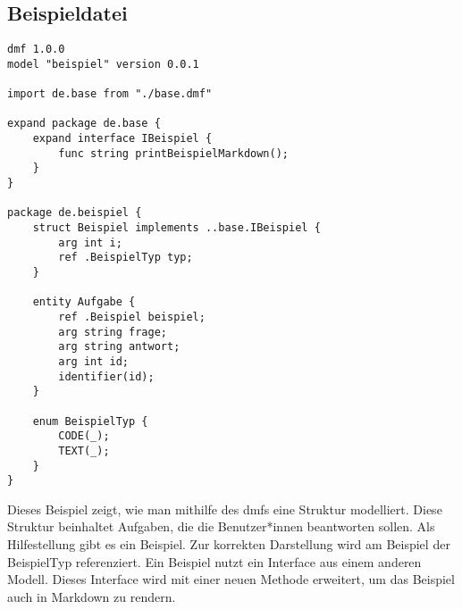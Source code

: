 \documentclass[./einleitung.tex]{subfiles}
\begin{document}
\subsection{Beispieldatei}\label{subsec:beispieldatei}
\begin{lstlisting}
dmf 1.0.0
model "beispiel" version 0.0.1

import de.base from "./base.dmf"

expand package de.base {
    expand interface IBeispiel {
        func string printBeispielMarkdown();
    }
}

package de.beispiel {
    struct Beispiel implements ..base.IBeispiel {
        arg int i;
        ref .BeispielTyp typ;
    }
    
    entity Aufgabe {
        ref .Beispiel beispiel;
        arg string frage;
        arg string antwort;
        arg int id;
        identifier(id);
    }
    
    enum BeispielTyp {
        CODE(_);
        TEXT(_);
    }
}
\end{lstlisting}
Dieses Beispiel zeigt, wie man mithilfe des \acrshort{dmf}s eine Struktur modelliert.
Diese Struktur beinhaltet Aufgaben, die die Benutzer*innen beantworten sollen.
Als Hilfestellung gibt es ein Beispiel.
Zur korrekten Darstellung wird am Beispiel der BeispielTyp referenziert.
Ein Beispiel nutzt ein Interface aus einem anderen Modell.
Dieses Interface wird mit einer neuen Methode erweitert, um das Beispiel auch in Markdown zu rendern.

\end{document}
